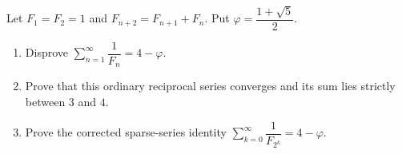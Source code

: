 Let $F_1=F_2=1$ and $F_{n+2}=F_{n+1}+F_n$. Put $\varphi=\dfrac{1+\sqrt5}{2}$.
\begin{enumerate}
\item Disprove $\displaystyle\sum_{n=1}^{\infty}\dfrac{1}{F_n}=4-\varphi$.
\item Prove that this ordinary reciprocal series converges and its sum lies strictly between $3$ and $4$.
\item Prove the corrected sparse-series identity $\displaystyle\sum_{k=0}^{\infty}\dfrac{1}{F_{2^k}}=4-\varphi$.
\end{enumerate}
